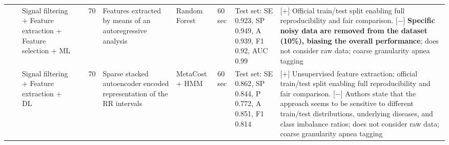 \documentclass[5p,twocolumn,lefttitle]{elsarticle}
\begin{document}
\begin{table*}[!ht]
{\begin{tabularx}{2\textwidth}{@{}m{2.5em}p{7em}p{10em}lp{2em}p{12em}p{7em}p{3em}p{17em}X@{}}
                            &                                                         & Signal filtering + Feature extraction + Feature selection + ML & \cite{zarei2020performance}              & 70            & Features extracted by means of an autoregressive analysis                                                         & Random Forest                       & 60 sec                                     & Test set: SE 0.923, SP 0.949, A 0.939, F1 0.92, AUC 0.99                                                                                                                             & [+]  Official train/test split enabling full reproducibility and fair comparison. [$-$] \textbf{Specific noisy data are removed from the dataset (10\%), biasing the overall performance}; does not consider raw data; coarse granularity apnea tagging                                                                                                                                                                                                          \\
                            \cmidrule(l){3-10} 
                            &                                                         & Signal filtering + Feature extraction + DL                     & \cite{feng2020sleep}                     & 70            & Sparse stacked autoencoder encoded representation of the RR intervals                                             & MetaCost + HMM                      & 60 sec                                     & Test set: SE 0.862, SP 0.844, P 0.772, A 0.851, F1 0.814                                                                                                                                  & [+] Unsupervised feature extraction; official train/test split enabling full reproducibility and fair comparison. [$-$] Authors state that the approach seems to be sensitive to different train/test distributions, underlying diseases, and class imbalance ratios; does not consider raw data; coarse granularity apnea tagging                                                                                                                      \\
                            \cmidrule(l){3-10} 

\end{tabularx}}
\end{table*}
\end{document}
